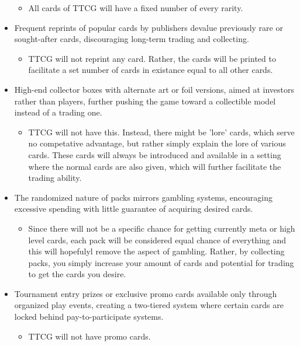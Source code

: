 \begin{itemize}
 	\begin{itemize}
		\item All cards of TTCG will have a fixed number of every rarity.
  	\end{itemize}
    	\item Frequent reprints of popular cards by publishers devalue previously rare or sought-after cards, discouraging long-term trading and collecting.
 	\begin{itemize}
		\item TTCG will not reprint any card. Rather, the cards will be printed to facilitate a set number of cards in existance equal to all other cards.
  	\end{itemize}
     	\item High-end collector boxes with alternate art or foil versions, aimed at investors rather than players, further pushing the game toward a collectible model instead of a trading one.
 	\begin{itemize}
		\item TTCG will not have this. Instead, there might be 'lore' cards, which serve no competative advantage, but rather simply explain the lore of various cards. These cards will always be introduced and available in a setting where the normal cards are also given, which will further facilitate the trading ability.
  	\end{itemize}
      	\item The randomized nature of packs mirrors gambling systems, encouraging excessive spending with little guarantee of acquiring desired cards.
 	\begin{itemize}
		\item Since there will not be a specific chance for getting currently meta or high level cards, each pack will be considered equal chance of everything and this will hopefulyl remove the aspect of gambling. Rather, by collecting packs, you simply increase your amount of cards and potential for trading to get the cards you desire.
  	\end{itemize}
        \item Tournament entry prizes or exclusive promo cards available only through organized play events, creating a two-tiered system where certain cards are locked behind pay-to-participate systems. 	
	\begin{itemize}
		\item TTCG will not have promo cards.
  	\end{itemize}
\end{itemize}












